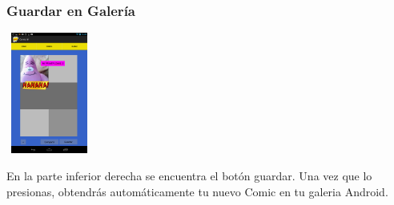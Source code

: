 \documentclass[utf8]{beamer}
\begin{document}
\begin{frame}
  \frametitle{Guardar en Galería}
 

  	\begin{center}
		\begingroup
			\includegraphics[height=4cm,width=2.8205cm]{imagenes/drag.png}
		\endgroup
	\end{center}

  \begin{block}{}
En la parte inferior derecha se encuentra el botón guardar. Una vez que lo presionas, obtendrás automáticamente tu nuevo Comic en tu galeria Android.
  \end{block}

\end{frame}
\end{document}
